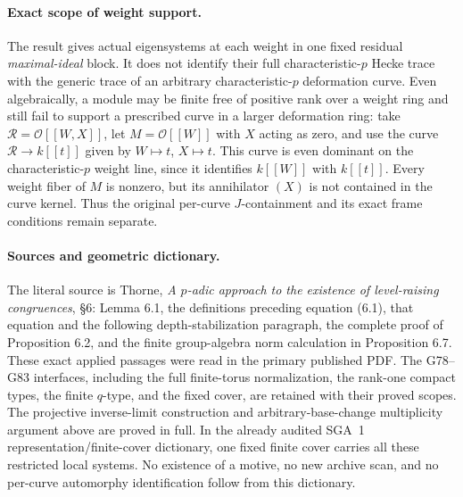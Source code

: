 \paragraph{Exact scope of weight support.}
The result gives actual eigensystems at each weight in one fixed
residual \emph{maximal-ideal} block.
It does not identify their full characteristic-\(p\) Hecke trace
with the generic trace of an arbitrary characteristic-\(p\)
deformation curve.
Even algebraically, a module may be finite free of positive rank over
a weight ring and still fail to support a prescribed curve in a
larger deformation ring: take
\(\mathcal R=\mathcal O[[W,X]]\), let
\(M=\mathcal O[[W]]\) with \(X\) acting as zero, and use the curve
\(\mathcal R\to k[[t]]\) given by \(W\mapsto t\), \(X\mapsto t\).
This curve is even dominant on the characteristic-\(p\) weight line,
since it identifies \(k[[W]]\) with \(k[[t]]\).
Every weight fiber of \(M\) is nonzero, but its annihilator \((X)\)
is not contained in the curve kernel.
Thus the original per-curve \(J\)-containment and its exact frame
conditions remain separate.

\paragraph{Sources and geometric dictionary.}
The literal source is Thorne,
\emph{A \(p\)-adic approach to the existence of level-raising
congruences}, \S6: Lemma 6.1, the definitions preceding equation
(6.1), that equation and the following depth-stabilization paragraph,
the complete proof of Proposition 6.2, and the finite group-algebra
norm calculation in Proposition 6.7.
These exact applied passages were read in the primary published PDF.
The G78--G83 interfaces, including the full finite-torus normalization,
the rank-one compact types, the finite \(q\)-type, and the fixed cover,
are retained with their proved scopes.
The projective inverse-limit construction and arbitrary-base-change
multiplicity argument above are proved in full.
In the already audited SGA~1 representation/finite-cover dictionary,
one fixed finite cover carries all these restricted local systems.
No existence of a motive, no new archive scan, and no per-curve
automorphy identification follow from this dictionary.
